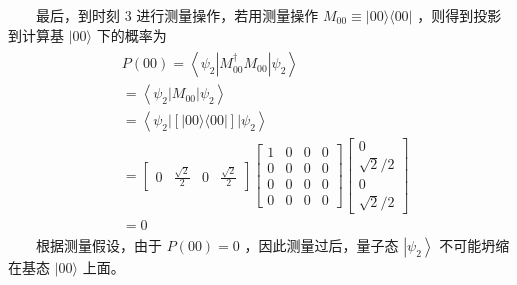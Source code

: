 \documentclass[a4paper,11pt,english]{sphinxmanual}
\begin{document}
\sphinxAtStartPar
  最后，到时刻 \(3\) 进行测量操作，若用测量操作 \(M_{00} \equiv|00\rangle\langle 00|\) ，则得到投影到计算基 \(|00\rangle\) 下的概率为
\begin{equation*}
\begin{split}\begin{aligned}&P(00)=\left\langle\psi_{2}\left|M_{00}^{\dagger} M_{00}\right| \psi_{2}\right\rangle \\&=\left\langle\psi_{2}\left|M_{00}\right| \psi_{2}\right\rangle \\&=\left\langle\psi_{2}|[|00\rangle\langle 00|]| \psi_{2}\right\rangle\\&=\left[\begin{array}{llll}0 & \frac{\sqrt{2}}{2} & 0 & \frac{\sqrt{2}}{2}\end{array}\right]\left[\begin{array}{llll}1 & 0 & 0 & 0 \\ 0 & 0 & 0 & 0 \\ 0 & 0 & 0 & 0 \\ 0 & 0 & 0 & 0\end{array}\right]\left[\begin{array}{c}0 \\ \sqrt{2} / 2 \\ 0 \\ \sqrt{2} / 2\end{array}\right]\\&=0\end{aligned}\end{split}
\end{equation*}
\sphinxAtStartPar
  根据测量假设，由于 \(P(00)=0\) ，因此测量过后，量子态  \(\left|\psi_{2}\right\rangle\) 不可能坍缩在基态 \(|00\rangle\) 上面。
\end{document}
